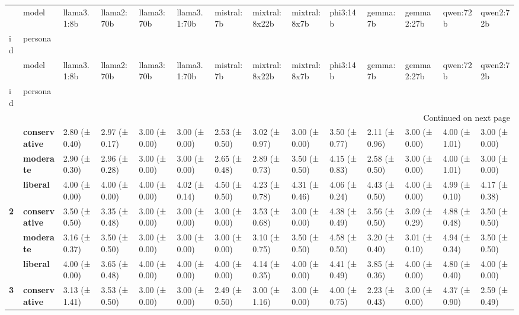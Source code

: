 \begin{longtable}{llllllllllllll}
\toprule
 & model & llama3.1:8b & llama2:70b & llama3:70b & llama3.1:70b & mistral:7b & mixtral:8x22b & mixtral:8x7b & phi3:14b & gemma:7b & gemma2:27b & qwen:72b & qwen2:72b \\
id & persona &  &  &  &  &  &  &  &  &  &  &  &  \\
\midrule
\endfirsthead
\toprule
 & model & llama3.1:8b & llama2:70b & llama3:70b & llama3.1:70b & mistral:7b & mixtral:8x22b & mixtral:8x7b & phi3:14b & gemma:7b & gemma2:27b & qwen:72b & qwen2:72b \\
id & persona &  &  &  &  &  &  &  &  &  &  &  &  \\
\midrule
\endhead
\midrule
\multicolumn{14}{r}{Continued on next page} \\
\midrule
\endfoot
\bottomrule
\endlastfoot
\multirow[t]{3}{*}{\textbf{1}} & \textbf{conservative} & 2.80 (± 0.40) & 2.97 (± 0.17) & 3.00 (± 0.00) & 3.00 (± 0.00) & 2.53 (± 0.50) & 3.02 (± 0.97) & 3.00 (± 0.00) & 3.50 (± 0.77) & 2.11 (± 0.96) & 3.00 (± 0.00) & 4.00 (± 1.01) & 3.00 (± 0.00) \\
\textbf{} & \textbf{moderate} & 2.90 (± 0.30) & 2.96 (± 0.28) & 3.00 (± 0.00) & 3.00 (± 0.00) & 2.65 (± 0.48) & 2.89 (± 0.73) & 3.50 (± 0.50) & 4.15 (± 0.83) & 2.58 (± 0.50) & 3.00 (± 0.00) & 4.00 (± 1.01) & 3.00 (± 0.00) \\
\textbf{} & \textbf{liberal} & 4.00 (± 0.00) & 4.00 (± 0.00) & 4.00 (± 0.00) & 4.02 (± 0.14) & 4.50 (± 0.50) & 4.23 (± 0.78) & 4.31 (± 0.46) & 4.06 (± 0.24) & 4.43 (± 0.50) & 4.00 (± 0.00) & 4.99 (± 0.10) & 4.17 (± 0.38) \\
\cline{1-14}
\multirow[t]{3}{*}{\textbf{2}} & \textbf{conservative} & 3.50 (± 0.50) & 3.35 (± 0.48) & 3.00 (± 0.00) & 3.00 (± 0.00) & 3.00 (± 0.00) & 3.53 (± 0.68) & 3.00 (± 0.00) & 4.38 (± 0.49) & 3.56 (± 0.50) & 3.09 (± 0.29) & 4.88 (± 0.48) & 3.50 (± 0.50) \\
\textbf{} & \textbf{moderate} & 3.16 (± 0.37) & 3.50 (± 0.50) & 3.00 (± 0.00) & 3.00 (± 0.00) & 3.00 (± 0.00) & 3.10 (± 0.75) & 3.50 (± 0.50) & 4.58 (± 0.50) & 3.20 (± 0.40) & 3.01 (± 0.10) & 4.94 (± 0.34) & 3.50 (± 0.50) \\
\textbf{} & \textbf{liberal} & 4.00 (± 0.00) & 3.65 (± 0.48) & 4.00 (± 0.00) & 4.00 (± 0.00) & 4.00 (± 0.00) & 4.14 (± 0.35) & 4.00 (± 0.00) & 4.41 (± 0.49) & 3.85 (± 0.36) & 4.00 (± 0.00) & 4.80 (± 0.40) & 4.00 (± 0.00) \\
\cline{1-14}
\multirow[t]{3}{*}{\textbf{3}} & \textbf{conservative} & 3.13 (± 1.41) & 3.53 (± 0.50) & 3.00 (± 0.00) & 3.00 (± 0.00) & 2.49 (± 0.50) & 3.00 (± 1.16) & 3.00 (± 0.00) & 4.00 (± 0.75) & 2.23 (± 0.43) & 3.00 (± 0.00) & 4.37 (± 0.90) & 2.59 (± 0.49) \\

\end{longtable}
